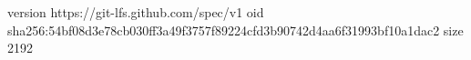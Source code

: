 version https://git-lfs.github.com/spec/v1
oid sha256:54bf08d3e78cb030ff3a49f3757f89224cfd3b90742d4aa6f31993bf10a1dac2
size 2192
